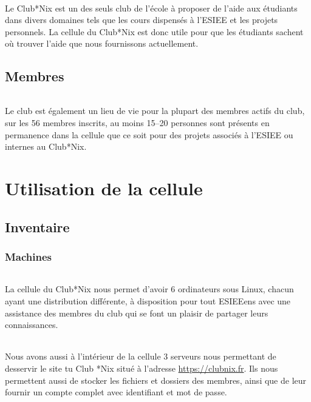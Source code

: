 \documentclass[11pt]{report}
\begin{document}
\paragraph{} Le Club*Nix est un des seuls club de l'école à proposer de l'aide
aux étudiants dans divers domaines tels que les cours dispensés à l'ESIEE et
les projets personnels. La cellule du Club*Nix est donc utile pour que les
étudiants sachent où trouver l'aide que nous fournissons actuellement.



\chapter{Membres}

\paragraph{} Le club est également un lieu de vie pour la plupart des membres
actifs du club, sur les 56 membres inscrits, au moins 15--20 personnes sont
présents en permanence dans la cellule que ce soit pour des projets 
associés à l'ESIEE ou internes au Club*Nix.


\part{Utilisation de la cellule}

\chapter{Inventaire}

\section{Machines}

\paragraph{} La cellule du Club*Nix nous permet d'avoir 6 ordinateurs sous
Linux, chacun ayant une distribution différente, à disposition pour tout
ESIEEens avec une assistance des membres du club qui se font un plaisir de
partager leurs connaissances.

\paragraph{} Nous avons aussi à l'intérieur de la cellule 3 serveurs nous
permettant de desservir le site tu Club *Nix situé à l'adresse
\url{https://clubnix.fr}. Ils nous permettent aussi de stocker les fichiers et
dossiers des membres, ainsi que de leur fournir un compte complet avec
identifiant et mot de passe.
\end{document}

